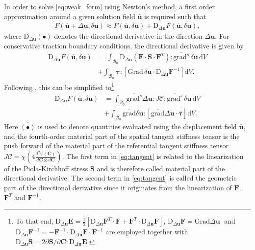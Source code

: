 \documentclass[AMA,STIX1COL]{WileyNJD-v2}
\newcommand*{\gz}[1]{\boldsymbol{#1}}
\newcommand*{\Grad}{\mathrm{Grad}}
\newcommand*{\grad}{\mathrm{grad}}
\renewcommand*{\d}{\mathrm{d}}
\newcommand*{\D}{\mathrm{D}}
\newcommand*{\mcl}[1]{\mathcal{#1}}
\begin{document}
In order to solve \eqref{eq:weak_form} using Newton's method, a first order approximation around a given solution field $\overline{\gz u}$ is required such that
\begin{align}
F(\overline{\gz u} + \Delta \gz u, \delta \gz u) \approx
F(\overline{\gz u}, \delta \gz u) + \D_{\displaystyle \Delta \gz u} F(\overline{\gz u}, \delta \gz u) ,
\end{align}
where $\D_{\displaystyle \Delta \gz u}(\bullet)$ denotes the directional derivative in the direction $\Delta \gz u$.
For conservative traction boundary conditions, the directional derivative is given by
\begin{equation}
\begin{split}
\D_{\displaystyle \Delta \gz u} F(\overline{\gz u}, \delta \gz u)
&=
\int_{\mcl B_0}
\D_{\displaystyle \Delta \gz u} \left(\gz F \cdot \gz S \cdot \gz F^T\right)  :
\overline{\grad^s} \, \delta \gz u
\, \d V
\\
& +
\int_{\mcl B_0}
\overline{\gz \tau} :
\left[
  \Grad \, \delta \gz u \cdot
  \D_{\displaystyle \Delta \gz u} \gz F^{-1}
\right] \d V.
\end{split}
\label{eq:tangent_pre}
\end{equation}
Following \cite{Wriggers2008}, this can be simplified to\footnote{To that end,
$\!\D_{\displaystyle \Delta \gz u} \gz E = \frac{1}{2}\left[\D_{\displaystyle \Delta \gz u} \gz F^T \cdot \gz F + \gz F^T \cdot \D_{\displaystyle \Delta \gz u} \gz F\right]$, $\D_{\displaystyle \Delta \gz u} \gz F = \Grad \Delta \gz u\;$  and
$\!\D_{\displaystyle \Delta \gz u} \gz F^{-1} = - \gz F^{-1} \cdot \D_{\displaystyle \Delta \gz u} \gz F \cdot \gz F^{-1}$
are employed together with
$\D_{\displaystyle \Delta \gz u} \gz S = 2 \partial \gz S / \partial \gz C : \D_{\displaystyle \Delta \gz u} \gz E$.
}
\begin{equation}
  \begin{split}
\D_{\displaystyle \Delta \gz u} F(\overline{\gz u}, \delta \gz u)
  &=
  \int_{\mcl B_0} \overline{\grad^s} \Delta \gz u : J \boldsymbol{\mathcal{C}} : \overline{\grad^s} \, \delta \gz u \, \d V \\
  &+
  \int_{\mcl B_0}
  \overline{\grad}\delta \gz u :
  \left[
  \overline{\grad} \Delta \gz u \cdot
  \overline{\gz \tau}
  \right]
  \d V.
\end{split}
\label{eq:tangent}
\end{equation}
Here $\overline{(\bullet)}$ is used to denote quantities evaluated using the displacement field $\overline {\gz u}$, and the fourth-order material part of the spatial tangent stiffness tensor is the push forward of the material part of the referential tangent stiffness tensor $J \boldsymbol{\mathcal{C}} = \chi\left( 4 \frac{d^{2} \psi \left( \mathbf{C} \right)}{d \mathbf{C} \otimes d \mathbf{C}} \right)$.
The first term in \eqref{eq:tangent} is related to the linearization of the Piola-Kirchhoff stress $\gz S$ and is therefore called material part of the directional derivative.
The second term in \eqref{eq:tangent} is called the geometric part of the directional derivative since it originates from the linearization of $\gz F$, $\gz F^T$ and $\gz F^{-1}$.
\end{document}
